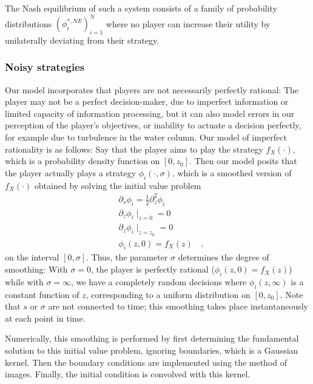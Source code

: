 The Nash equilibrium of such a system consists of a family of probability distributions $(\phi_i^{*,NE})_{i=1}^N$ where no player can increase their utility by unilaterally deviating from their strategy.%

\subsubsection*{Noisy strategies}
Our model incorporates that players are not necessarily perfectly rational: The player may not be a perfect decision-maker, due to imperfect information or limited capacity of information processing, but it can also model errors in our perception of the player's objectives, or inability to actuate a decision perfectly, for example due to turbulence in the water column. Our model of imperfect rationality is as follows: Say that the player aims to play the strategy $f_X(\cdot)$, which is a probability density function on $[0,z_0]$. Then our model posits that the player actually plays a strategy $\phi_i(\cdot ,\sigma)$, which is a smoothed version of $f_X(\cdot)$ obtained by solving the initial value problem
\begin{align}
  \label{eq:density_PDE}
  &\partial_s \phi_i = \frac{1}{2}\partial_z^2 \phi_i \\
  &\partial_z \phi_i \mid_{z=0} = 0 \\
  &\partial_z \phi_i \mid_{z = z_0} = 0 \\
  & \phi_i(z,0) = f_X(z) \quad .
\end{align}
on the interval $[0,\sigma]$. Thus, the parameter $\sigma$ determines the degree of smoothing: With $\sigma=0$, the player is perfectly rational ($\phi_i(z,0)=f_X(z)$) while with $\sigma=\infty$, we have a completely random decisions where $\phi_i(z,\infty)$ is a constant function of $z$, corresponding to a uniform distribution on $[0,z_0]$. Note that $s$ or $\sigma$ are not connected to time; this smoothing takes place instantaneously at each point in time.

Numerically, this smoothing is performed by first determining the fundamental solution to this initial value problem, ignoring boundaries, which is a Gaussian kernel. Then the boundary conditions are implemented using the method of images. Finally, the initial condition is convolved with this kernel.



